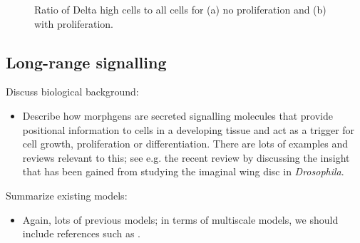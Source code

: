 \documentclass{article}
\begin{document}
\begin{figure}
\centering
\setlength{\unitlength}{1cm}
\caption{Ratio of Delta high cells to all cells for (a) no proliferation and  (b) with proliferation.}
\label{fig:DeltaNotchStats:metrics}
\end{figure}

\subsection{Long-range signalling} \label{sec:morphagens}

Discuss biological background:
\begin{itemize}
\item Describe how morphgens are secreted signalling molecules that provide positional information to cells in a developing tissue and act as a trigger for cell growth, proliferation or differentiation. There are lots of examples and reviews relevant to this; see e.g. the recent review by \citet{Wartlick2011Understanding} discussing the insight that has been gained from studying the imaginal wing disc in {\it Drosophila}.
\end{itemize}

\noindent Summarize existing models:
\begin{itemize}
\item Again, lots of previous models; in terms of multiscale models, we should include references such as \citet{Schilling2011Cell}.
\end{itemize}
\end{document}
